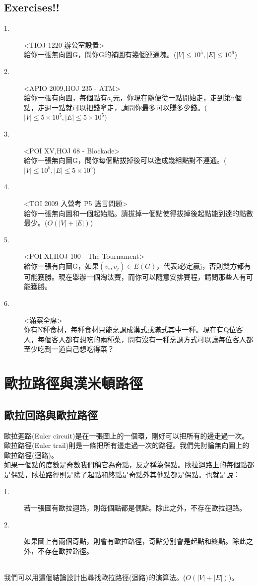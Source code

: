 \documentclass{article}
\begin{document}
\subsection{Exercises!!}
\begin{description}
\item[ 1.]<TIOJ 1220 辦公室設置>\\
給你一張無向圖G，問你G的補圖有幾個連通塊。($|V|\leq 10^5,|E|\leq 10^6$)
\item[ 2.]<APIO 2009,HOJ 235 - ATM>\\
給你一張有向圖，每個點有$a_i$元，你現在隨便從一點開始走，走到第n個點，走過一點就可以把錢拿走，請問你最多可以賺多少錢。($|V|\leq 5\times 10^5,|E|\leq 5\times 10^5$)
\item[ 3.]<POI XV,HOJ 68 - Blockade>\\
給你一張無向圖G，問你每個點拔掉後可以造成幾組點對不連通。($|V|\leq 10^5,|E|\leq 5\times 10^5$)
\item[ 4.]<TOI 2009 入營考 P5 謠言問題>\\
給你一張無向圖和一個起始點。請拔掉一個點使得拔掉後起點能到達的點數最少。($O(|V|+|E|)$)
\item[ 5.]<POI XI,HOJ 100 - The Tournament>\\
給你一張有向圖G，如果$(v_i,v_j)\in E(G)$，代表i必定贏j，否則雙方都有可能獲勝。現在舉辦一個淘汰賽，而你可以隨意安排賽程，請問那些人有可能獲勝。
\item[ 6.]<滿案全席>\\
你有N種食材，每種食材只能烹調成漢式或滿式其中一種。現在有Q位客人，每個客人都有想吃的兩種菜，問有沒有一種烹調方式可以讓每位客人都至少吃到一道自己想吃得菜？
\end{description}


\section{歐拉路徑與漢米頓路徑}
\subsection{歐拉回路與歐拉路徑}
歐拉迴路(Euler circuit)是在一張圖上的一個環，剛好可以把所有的邊走過一次。歐拉路徑(Euler trail)則是一條把所有邊走過一次的路徑。我們先討論無向圖上的歐拉路徑(迴路)。\\[2em]
如果一個點的度數是奇數我們稱它為奇點，反之稱為偶點。歐拉迴路上的每個點都是偶點，歐拉路徑則是除了起點和終點是奇點外其他點都是偶點。也就是說：
\begin{description}
\item[ 1.]若一張圖有歐拉迴路，則每個點都是偶點。除此之外，不存在歐拉迴路。
\item[ 2.]如果圖上有兩個奇點，則會有歐拉路徑，奇點分別會是起點和終點。除此之外，不存在歐拉路徑。
\end{description}
~\\我們可以用這個結論設計出尋找歐拉路徑(迴路)的演算法。($O(|V|+|E|)$)。
\end{document}
